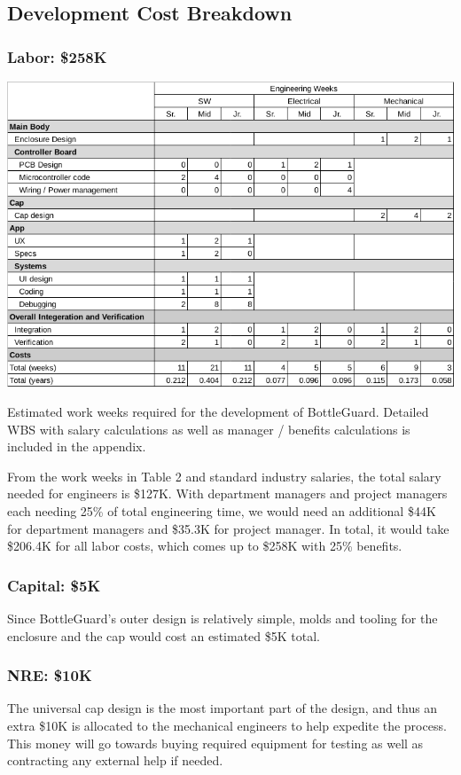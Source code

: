 \documentclass[12pt]{article}
\begin{document}
	\subsection*{Development Cost Breakdown}
	\subsubsection*{Labor: \$258K}
		\begin{table}[H]
		\includegraphics[width=\textwidth]{wbs_small.png}

		\caption{Estimated work weeks required for the development of BottleGuard. Detailed WBS with salary calculations as well as manager / benefits calculations is included in the appendix.}
	\end{table}
From the work weeks in Table 2 and standard industry salaries, the total salary needed for engineers is \$127K. With department managers and project managers each needing 25\% of total engineering time, we would need an additional \$44K for department managers and \$35.3K for project manager. In total, it would take \$206.4K for all labor costs, which comes up to \$258K with 25\% benefits.
	\subsubsection*{Capital: \$5K}
Since BottleGuard’s outer design is relatively simple, molds and tooling for the enclosure and the cap would cost an estimated \$5K total.
	\subsubsection*{NRE: \$10K}
	The universal cap design is the most important part of the design, and thus an extra \$10K is allocated to the mechanical engineers to help expedite the process. This money will go towards buying required equipment for testing as well as contracting any external help if needed.
	
\end{document}
